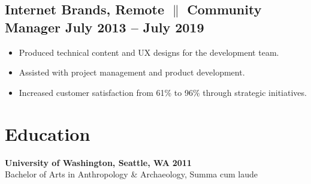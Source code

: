\documentclass[a4paper,10pt]{article}
\begin{document}
\subsection{Internet Brands, Remote {$\parallel$}{ Community Manager} \hfill
      \textbf{July 2013 – July
            2019}}
\begin{itemize}
      \item Produced technical content and UX designs for the development team.
      \item Assisted with project management and product development.
      \item Increased customer satisfaction from 61\% to 96\% through strategic
            initiatives.
\end{itemize}

\section{Education}
\textbf{University of Washington, Seattle, WA} \hfill
\textbf{2011}
\\
Bachelor of Arts in Anthropology \& Archaeology, Summa cum laude
\end{document}
